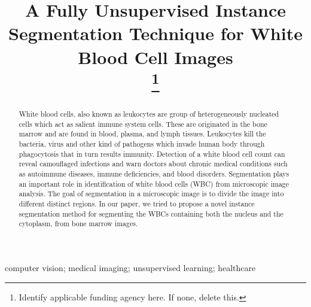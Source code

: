 \documentclass[conference]{IEEEtran}
\begin{document}
\title{A Fully Unsupervised Instance Segmentation Technique for White Blood Cell Images\\
\thanks{Identify applicable funding agency here. If none, delete this.}
}

\author{
\and
{}

}

\maketitle

\begin{abstract}
    White blood cells, also known as leukocytes are group of heterogeneously nucleated cells which act as salient immune system cells. These are originated in the bone marrow and are found in blood, plasma, and lymph tissues. Leukocytes kill the bacteria, virus and other kind of pathogens which invade human body through phagocytosis that in turn results immunity. Detection of a white blood cell count can reveal camouflaged infections and warn doctors about chronic medical conditions such as autoimmune diseases, immune deficiencies, and blood disorders. Segmentation plays an important role in identification of white blood cells (WBC) from microscopic image analysis. The goal of segmentation in a microscopic image is to divide the image into different distinct regions. In our paper, we tried to propose a novel instance segmentation method for segmenting the WBCs containing both the nucleus and the cytoplasm, from bone marrow images.
    
\end{abstract}

\begin{IEEEkeywords}
computer vision; medical imaging; unsupervised learning; healthcare
\end{IEEEkeywords}
\end{document}
